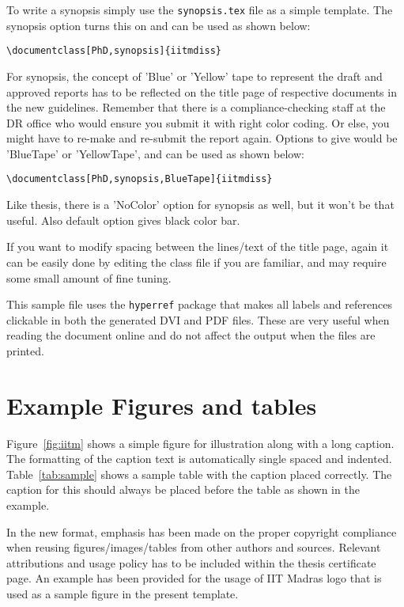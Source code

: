 To write a synopsis simply use the \verb+synopsis.tex+ file as a
simple template.  The synopsis option turns this on and can be used as
shown below:
\begin{verbatim}
\documentclass[PhD,synopsis]{iitmdiss}                                
\end{verbatim}

For synopsis, the concept of 'Blue' or 'Yellow' tape to represent
the draft and approved reports has to be reflected on the title page
of respective documents in the new guidelines. Remember that there is a 
compliance-checking staff at the DR office who would ensure you submit it
with right color coding. Or else, you might have to re-make and re-submit
the report again. Options to give would be 'BlueTape' or 'YellowTape',
and can be used as shown below:
\begin{verbatim}
\documentclass[PhD,synopsis,BlueTape]{iitmdiss}                                
\end{verbatim}

Like thesis, there is a 'NoColor' option for synopsis as well, but it won't
be that useful. Also default option gives black color bar.


If you want to modify spacing between the lines/text of the title page, again 
it can be easily done by editing the class file if you are familiar,
and may require some small amount of fine tuning.
 
 
This sample file uses the \verb+hyperref+ package that makes all
labels and references clickable in both the generated DVI and PDF
files.  These are very useful when reading the document online and do
not affect the output when the files are printed.


\section{Example Figures and tables}

Figure~\ref{fig:iitm} shows a simple figure for illustration along with
a long caption.  The formatting of the caption text is automatically
single spaced and indented.  Table~\ref{tab:sample} shows a sample
table with the caption placed correctly.  The caption for this should
always be placed before the table as shown in the example.

In the new format, emphasis has been made on the proper copyright compliance 
when reusing figures/images/tables from other authors and sources. Relevant
attributions and usage policy has to be included within the thesis certificate
page. An example has been provided for the usage of IIT Madras logo that 
is used as a sample figure in the present template.

